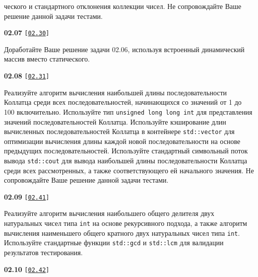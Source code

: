 \documentclass[a4paper,12pt]{article}
\begin{document}
ческого и стандартного отклонения коллекции чисел. Не сопровождайте Ваше решение данной задачи тестами.

\bigskip

{\large \textbf{02.07} \texttt{[\href{https://github.com/i-s-m-mipt/Education/blob/master/projects/examples/source/02.30.cpp}{\texttt{02.30}}]}}

\bigskip

Доработайте Ваше решение задачи 02.06, используя встроенный динамический массив вместо статического.

\bigskip

{\large \textbf{02.08} \texttt{[\href{https://github.com/i-s-m-mipt/Education/blob/master/projects/examples/source/02.31.cpp}{\texttt{02.31}}]}}

\bigskip

Реализуйте алгоритм вычисления наибольшей длины последовательности Коллатца среди всех последовательностей, начинающихся со значений от 1 до 100 включительно. Используйте тип \lstinline{unsigned long long int} для представления значений последовательностей Коллатца. Используйте кэширование длин вычисленных последовательностей Коллатца в контейнере \lstinline{std::vector} для оптимизации вычисления длины каждой новой последовательности на основе предыдущих последовательностей. Используйте стандартный символьный поток вывода \lstinline{std::cout} для вывода наибольшей длины последовательности Коллатца среди всех рассмотренных, а также соответствующего ей начального значения. Не сопровождайте Ваше решение данной задачи тестами.

\bigskip

{\large \textbf{02.09} \texttt{[\href{https://github.com/i-s-m-mipt/Education/blob/master/projects/examples/source/02.41.cpp}{\texttt{02.41}}]}}

\bigskip

Реализуйте алгоритм вычисления наибольшего общего делителя двух натуральных чисел типа \lstinline{int} на основе рекурсивного подхода, а также алгоритм вычисления наименьшего общего кратного двух натуральных чисел типа \lstinline{int}. Используйте стандартные функции \lstinline{std::gcd} и \lstinline{std::lcm} для валидации результатов тестирования.

\bigskip

{\large \textbf{02.10} \texttt{[\href{https://github.com/i-s-m-mipt/Education/blob/master/projects/examples/source/02.42.cpp}{\texttt{02.42}}]}}

\bigskip
\end{document}
